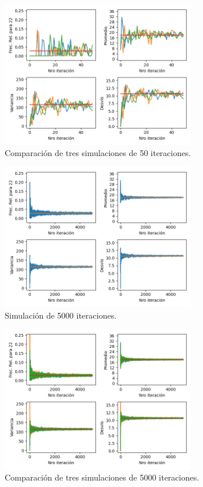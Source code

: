\documentclass{article}
\begin{document}
\begin{figure}[H]
\centering
\includegraphics[width=0.75\textwidth]{images/Figure_2.png}
\caption{Comparación de tres simulaciones de 50 iteraciones.}
\label{fig:50iter3}
\end{figure}
 
\begin{figure}[H]
\centering
\includegraphics[width=0.75\textwidth]{images/Figure_3.png}
\caption{Simulación de 5000 iteraciones.}
\label{fig:5000iter}
\end{figure}
 
\begin{figure}[H]
\centering
\includegraphics[width=0.75\textwidth]{images/Figure_4.png}
\caption{Comparación de tres simulaciones de 5000 iteraciones.}
\label{fig:5000iter3}
\end{figure}
\end{document}
